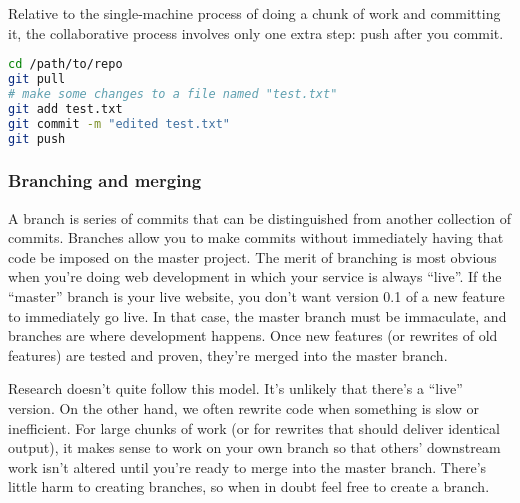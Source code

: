Relative to the single-machine process of doing a chunk of work and committing it,
the collaborative process involves only one extra step:
push after you commit.
\begin{lstlisting}[language=bash]
cd /path/to/repo
git pull
# make some changes to a file named "test.txt"
git add test.txt
git commit -m "edited test.txt"
git push
\end{lstlisting}


\subsubsection{Branching and merging}
A branch is series of commits that can be distinguished from another collection of commits.
Branches allow you to make commits without immediately having that code be imposed on the master project.
The merit of branching is most obvious when you're doing web development in which your service is always ``live''.
If the ``master'' branch is your live website, you don't want version 0.1 of a new feature to immediately go live.
In that case, the master branch must be immaculate, and branches are where development happens.
Once new features (or rewrites of old features) are tested and proven, they're merged into the master branch.

Research doesn't quite follow this model.
It's unlikely that there's a ``live'' version.
On the other hand, we often rewrite code when something is slow or inefficient.
For large chunks of work (or for rewrites that should deliver identical output), it makes sense to work on your own branch so that others' downstream work isn't altered until you're ready to merge into the master branch.
There's little harm to creating branches, so when in doubt feel free to create a branch.

